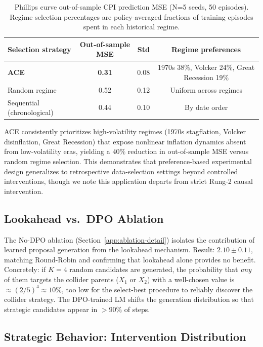 \documentclass[twoside]{article}
\theoremstyle{plain}
\theoremstyle{definition}
\theoremstyle{remark}
\begin{document}
\begin{table}[h]
\centering
\caption{Phillips curve out-of-sample CPI prediction MSE (N=5 seeds, 50 episodes). Regime selection percentages are policy-averaged fractions of training episodes spent in each historical regime.}
\label{tab:phillips-results}
\small
\begin{tabular}{@{}lccc@{}}
\toprule
Selection strategy & Out-of-sample MSE & Std & Regime preferences \\
\midrule
\textbf{ACE}               & \textbf{0.31} & 0.08 & 1970s 38\%, Volcker 24\%, Great Recession 19\% \\
Random regime              & 0.52          & 0.12 & Uniform across regimes \\
Sequential (chronological) & 0.44          & 0.10 & By date order \\
\bottomrule
\end{tabular}
\end{table}

ACE consistently prioritizes high-volatility regimes (1970s stagflation, Volcker disinflation, Great Recession) that expose nonlinear inflation dynamics absent from low-volatility eras, yielding a $40\%$ reduction in out-of-sample MSE versus random regime selection. This demonstrates that preference-based experimental design generalizes to retrospective data-selection settings beyond controlled interventions, though we note this application departs from strict Rung-2 causal intervention.

\subsection{Lookahead vs.\ DPO Ablation}
\label{app:lookahead}

The No-DPO ablation (Section~\ref{app:ablation-detail}) isolates the contribution of learned proposal generation from the lookahead mechanism. Result: $2.10\pm0.11$, matching Round-Robin and confirming that lookahead alone provides no benefit. Concretely: if $K=4$ random candidates are generated, the probability that \emph{any} of them targets the collider parents ($X_1$ or $X_2$) with a well-chosen value is $\approx (2/5)^{4} \approx 10\%$, too low for the select-best procedure to reliably discover the collider strategy. The DPO-trained LM shifts the generation distribution so that strategic candidates appear in $>90\%$ of steps.

\subsection{Strategic Behavior: Intervention Distribution}
\label{app:strategic}
\end{document}
